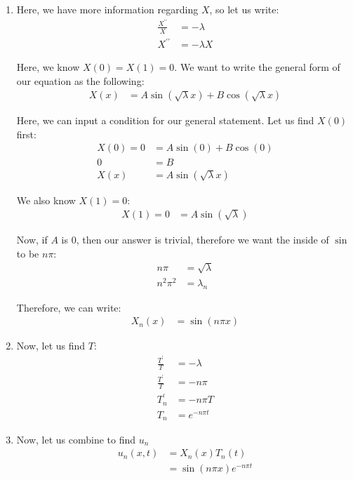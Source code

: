 \documentclass{article}
\begin{document}
\begin{enumerate}
\begin{enumerate}
  \item Here, we have more information regarding $X$, so let us write:
  \begin{align}
    \frac{X^{\prime\prime}}{X} & = -\lambda\\
    X^{\prime\prime} & = -\lambda X
  \end{align}

  Here, we know $X(0) = X(1) = 0$. We want to write the general form of our equation as the following:
  \begin{align}
    X(x) & = A \sin\left( \sqrt \lambda x\right) + B \cos\left( \sqrt \lambda x\right)
  \end{align}

  Here, we can input a condition for our general statement. Let us find $X(0)$ first:
  \begin{align}
    X(0) = 0 & = A \sin(0) + B \cos(0)\\
    0 & = B\\
    X(x) & = A \sin(\sqrt \lambda x)
  \end{align}

  We also know $X(1) = 0$:
%
  \begin{align}
    X(1) = 0 & = A \sin(\sqrt \lambda)
  \end{align}

  Now, if $A$ is $0$, then our answer is trivial, therefore we want the inside of $\sin$ to be $n \pi$:
  \begin{align}
    n \pi & = \sqrt \lambda\\
    n^2 \pi^2 & = \lambda_n
  \end{align}

  Therefore, we can write:
  \begin{align}
    X_n(x) & = \sin(n \pi x)
  \end{align}

  \item Now, let us find $T$:
  \begin{align}
    \frac{T^\prime}{T} & = -\lambda\\
    \frac{T^\prime}{T} & = - n \pi\\
    T^\prime_n & = - n \pi T\\
    T_n & = e^{-n \pi t}
  \end{align}

  \item Now, let us combine to find $u_n$
  \begin{align}
    u_n(x, t) & = X_n(x)T_n(t)\\
    & = \sin(n \pi x) e^{-n \pi t}
  \end{align}


\end{enumerate}
\end{enumerate}
\end{document}
